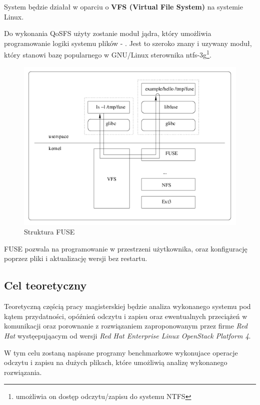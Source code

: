 System będzie działał w oparciu o
\textbf{VFS (Virtual File System)} na systemie Linux.

Do wykonania QoSFS użyty zostanie moduł jądra, który umożliwia programowanie
logiki systemu plików - . Jest to szeroko znany i uzywany
moduł, który stanowi bazę popularnego w GNU/Linux sterownika ntfs-3g\footnote{umożliwia
on dostęp odczytu/zapisu do systemu NTFS}.

\begin{figure}[h!]
	\centering
	\includegraphics[scale=0.5]{fuse_structure.png}
		\caption{Struktura FUSE}
\end{figure}

FUSE pozwala na programowanie w przestrzeni użytkownika, oraz konfigurację poprzez
pliki i aktualizację wersji bez restartu.

\subsection{Cel teoretyczny}
Teoretyczną częścią pracy magisterskiej będzie analiza wykonanego systemu pod kątem przydatności,
opóźnień odczytu i zapisu oraz ewentualnych przeciążeń w komunikacji
oraz porownanie z rozwiązaniem zaproponowanym przez firme \emph{Red Hat} wystęepująacym
od wersji \emph{Red Hat Enterprise Linux OpenStack Platform 4}.

W tym celu zostaną napisane programy benchmarkowe wykonujace operacje
odczytu i zapisu na dużych plikach, które umożliwią analizę wykonanego rozwiązania.